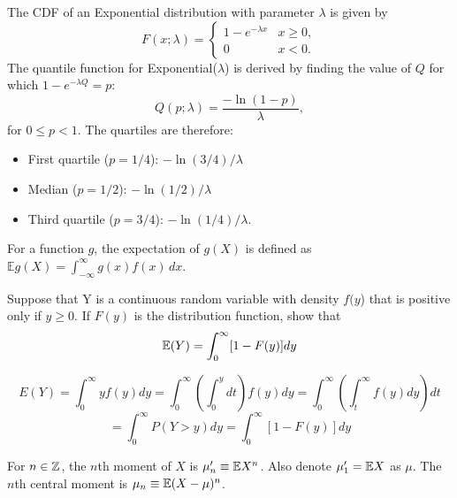 \documentclass[DIV=14,titlepage=false]{scrreprt}
\begin{document}
\begin{example}
The CDF of an Exponential distribution with parameter \(\lambda\) is given by
  \[
  F(x; \lambda) = 
  \begin{cases} 
  1 - e^{-\lambda x} & x \geq 0, \\
  0 & x < 0.
  \end{cases}
  \]
  The quantile function for Exponential(\(\lambda\)) is derived by finding the value of \(Q\) for which \(1 - e^{-\lambda Q} = p\):
  \[
  Q(p; \lambda) = \frac{-\ln(1 - p)}{\lambda},
  \]
  for \(0 \leq p < 1\). The quartiles are therefore:
  
  \begin{itemize}
    \item First quartile (\(p = 1/4\)): \( -\ln(3/4) / \lambda \)
    \item Median (\(p = 1/2\)): \( -\ln(1/2) / \lambda \)
    \item Third quartile (\(p = 3/4\)): \( -\ln(1/4) / \lambda \).
  \end{itemize}

\end{example}
\vspace{5pt}
\begin{definition}[Expectation]
  For a function \( g \), the expectation of \( g(X) \) is defined as \( \mathbb{E}g(X) = \int_{-\infty}^{\infty} g(x)f(x) \, dx \).
\end{definition}
\vspace{5pt}

\begin{exercise}
  Suppose that Y is a continuous random variable with density $f(y$) that is positive only if $y \geq 0$. If $F(y)$ is the distribution function, show that \[ \mathbb{E}(Y)= \int_{0}^{\infty} [1 - F(y)]dy \]
\end{exercise}
\begin{solution}
  \[E(Y) = \int_{0}^{\infty} yf(y)dy = \int_{0}^{\infty} \left( \int_{0}^{y} dt \right) f(y)dy = \int_{0}^{\infty} \left( \int_{t}^{\infty} f(y)dy \right) dt \] \[ = \int_{0}^{\infty} P(Y > y)dy = \int_{0}^{\infty} [1 - F(y)]dy\]

\end{solution}
\begin{definition}[Moment]
   For $ n \in \mathbb{Z} $, the $ n $th moment of $ X $ is $ \mu_{n}' \equiv \mathbb{E} X^n $. Also denote $ \mu_{1}' = \mathbb{E} X $ as $ \mu $. The $ n $th central moment is $ \mu_n \equiv \mathbb{E}(X - \mu)^n $.
\end{definition}
\end{document}
